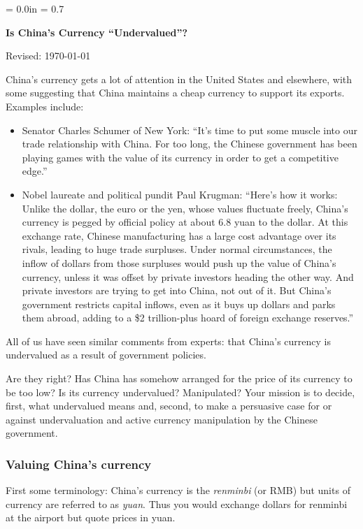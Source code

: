 \documentclass[letterpaper,12pt]{article}
\def\HeadName{Is China's Currency ``Undervalued''?}
\begin{document}
\parindent = 0.0in
\parskip = 0.7\bigskipamount
\thispagestyle{empty}%
\Head

\centerline{\large \bf \HeadName}%
\centerline{Revised:  \today}

\bigskip 
China's currency gets a lot of attention in the United States and 
elsewhere, with some suggesting that China maintains a cheap 
currency to support its exports.  
Examples include:
% 
\begin{itemize}
\item Senator Charles Schumer of New York:
``It's time to put some muscle into our trade relationship with China. 
For too long, the Chinese government has been playing games with the value of its currency in order to get a competitive edge.''

\item Nobel laureate and political pundit Paul Krugman:  
``Here's how it works: Unlike the dollar, the euro or the yen, whose values fluctuate freely, China's currency is pegged by official policy at about 6.8 yuan to the dollar.  At this exchange rate, Chinese manufacturing has a large cost advantage over its rivals, leading to huge trade surpluses.
Under normal circumstances, the inflow of dollars from those surpluses would push up the value of China's currency, unless it was offset by private investors heading the other way.  And private investors are trying to get into China, not out of it. But China's government restricts capital inflows, even as it buys up dollars and parks them abroad, adding to a \$2 trillion-plus hoard of foreign exchange reserves.''  
\end{itemize}
%
All of us have seen similar comments from experts:  
that China's currency is undervalued as a result 
of government policies.  


Are they right?  
Has China has somehow arranged for 
the price of its currency to be too low?  
Is its currency undervalued?  Manipulated?  
Your mission is to decide, first, 
what undervalued means and, second, 
to make a persuasive case for or against 
undervaluation and 
active currency manipulation by the Chinese government.  


\subsubsection*{Valuing China's currency}

First some terminology:  
China's currency is the {\it renminbi\/} (or RMB) 
but units of currency are referred to as {\it yuan\/}. 
Thus you would exchange dollars for renminbi at the airport
but quote prices in yuan.
\end{document}
